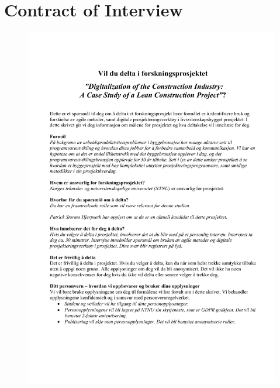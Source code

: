\let\cleardoublepage\clearpage

\chapter{Contract of Interview} \label{apx:contract}
\begin{figure}
    \centering
    \includegraphics[width=\textwidth]{appendix/kontrakt.pdf}
\end{figure}
